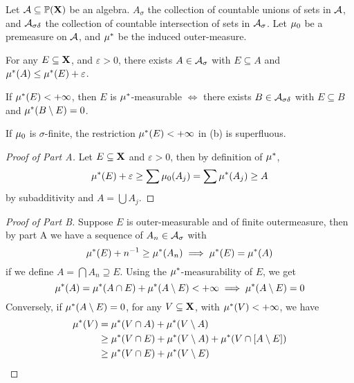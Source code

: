 \documentclass[../../main.tex]{subfiles}
\begin{document}
\begin{wts}
    Let $\mathcal{A}\subseteq\mathbb{P}({\mathbf{X}})$ be an algebra. $A_\sigma$ the collection of countable unions of sets in $\mathcal{A}$, and $\mathcal{A}_{\sigma\delta}$ the collection of countable intersection of sets in $\mathcal{A}_\sigma$. Let $\mu_0$ be a premeasure on $\mathcal{A}$, and $\mu^*$ be the induced outer-measure.
    \begin{enumalpha}
        \item For any $E\subseteq{\mathbf{X}}$, and $\varepsilon>0$, there exists $A\in\mathcal{A}_{\sigma}$ with $E\subseteq A$ and $\mu^*(A)\leq\mu^*(E)+\varepsilon$.
        \item If $\mu^*(E)<+\infty$, then $E$ is $\mu^*$-measurable $\iff$ there exists $B\in\mathcal{A}_{\sigma\delta}$ with $E\subseteq B$ and $\mu^*(B\setminus E) = 0$.
        \item If $\mu_0$ is $\sigma$-finite, the restriction $\mu^*(E)<+\infty$ in (b) is superfluous.
    \end{enumalpha}
\end{wts}
\begin{proof}[Proof of Part A]
    Let $E\subseteq {\mathbf{X}}$ and $\varepsilon>0$, then by definition of $\mu^*$, 
    \[
        \mu^*(E) + \varepsilon\geq \sum \mu_0(A_j) = \sum \mu^*(A_j)\geq A
    \]
    by subadditivity and $A = \bigcup A_j$.
\end{proof}
\begin{proof}[Proof of Part B]
    Suppose $E$ is outer-measurable and of finite outermeasure, then by part A we have a sequence of $A_n\in\mathcal{A}_{\sigma}$ with
    \[
        \mu^*(E)+n^{-1}\geq \mu^*(A_n)\implies \mu^*(E) = \mu^*(A)
    \]
    if we define $A = \bigcap A_n\supseteq E$. Using the $\mu^*$-measurability of $E$, we get
    \[
        \mu^*(A) = \mu^*(A\cap E) + \mu^*(A\setminus E) < +\infty \implies \mu^*(A\setminus E) = 0
    \]
    Conversely, if $\mu^*(A\setminus E) = 0$, for any $V\subseteq {\mathbf{X}}$, with $\mu^*(V)<+\infty$, we have
    \begin{align*}
        \mu^*(V) &= \mu^*(V\cap A) + \mu^*(V\setminus A)\\
        &\geq \mu^*(V\cap E) + \mu^*(V\setminus A) + \mu^*(V\cap [A\setminus E])\\
        &\geq \mu^*(V\cap E) + \mu^*(V\setminus E)
    \end{align*}
\end{proof}
\end{document}
